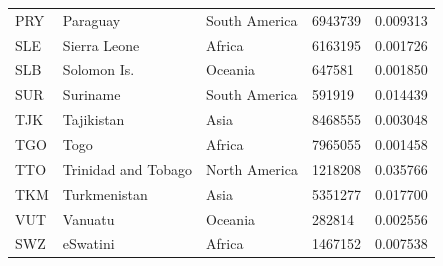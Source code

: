 \documentclass[11pt]{report}
\begin{document}
\begin{table}[]
\begin{tabular}{lllll}
            PRY                           & Paraguay                  & South America                  & 6943739                       & 0.009313                           \\
            SLE                           & Sierra Leone              & Africa                         & 6163195                       & 0.001726                           \\
            SLB                           & Solomon Is.               & Oceania                        & 647581                        & 0.001850                           \\
            SUR                           & Suriname                  & South America                  & 591919                        & 0.014439                           \\
            TJK                           & Tajikistan                & Asia                           & 8468555                       & 0.003048                           \\
            TGO                           & Togo                      & Africa                         & 7965055                       & 0.001458                           \\
            TTO                           & Trinidad and Tobago       & North America                  & 1218208                       & 0.035766                           \\
            TKM                           & Turkmenistan              & Asia                           & 5351277                       & 0.017700                           \\
            VUT                           & Vanuatu                   & Oceania                        & 282814                        & 0.002556                           \\
            SWZ                           & eSwatini                  & Africa                         & 1467152                       & 0.007538
        \end{tabular}
    \end{table}
\end{document}
